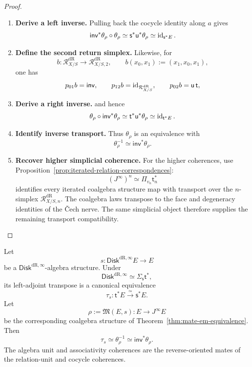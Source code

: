 \begin{proof}
\begin{enumerate}[label=\textup{(\arabic*)}]
    \item \textbf{Derive a left inverse.}
Pulling back the cocycle identity along \(a\) gives
\[
  \mathsf{inv}^*\theta_\rho\circ\theta_\rho
  \simeq
  \mathsf s^*\mathsf u^*\theta_\rho
  \simeq
  \operatorname{id}_{\mathsf s^*E}.
\]

    \item \textbf{Define the second return simplex.}
Likewise, for
\[
  b:\mathcal R^{\mathrm{dR}}_{X/S}\to \mathcal R^{\mathrm{dR}}_{X/S,2},
  \qquad
  b(x_0,x_1):=(x_1,x_0,x_1),
\]
one has
\[
  p_{01}b=\mathsf{inv},
  \qquad
  p_{12}b=\operatorname{id}_{\mathcal R^{\mathrm{dR}}_{X/S}},
  \qquad
  p_{02}b=\mathsf u\,\mathsf t,
\]

    \item \textbf{Derive a right inverse.}
and hence
\[
  \theta_\rho\circ\mathsf{inv}^*\theta_\rho
  \simeq
  \mathsf t^*\mathsf u^*\theta_\rho
  \simeq
  \operatorname{id}_{\mathsf t^*E}.
\]

    \item \textbf{Identify inverse transport.}
Thus \(\theta_\rho\) is an equivalence with
\[
  \theta_\rho^{-1}\simeq\mathsf{inv}^*\theta_\rho.
\]

    \item \textbf{Recover higher simplicial coherence.}
For the higher coherences, use
Proposition~\ref{prop:iterated-relation-correspondences}:
\[
  (J^\infty)^n
  \simeq
  \Pi_{v_n}\mathsf t_n^*
\]
identifies every iterated coalgebra structure map with transport over the
\(n\)-simplex \(\mathcal R^{\mathrm{dR}}_{X/S,n}\). The coalgebra laws transpose to the face and degeneracy identities of the
\v{C}ech nerve. The same simplicial object therefore supplies the remaining
transport compatibility.
\end{enumerate}
\end{proof}

\begin{proposition}
\label{prop:disk-algebra-relation-transport}
Let
\[
  s:\mathsf{Disk}^{\mathrm{dR},\infty} E\longrightarrow E
\]
be a \(\mathsf{Disk}^{\mathrm{dR},\infty}\)-algebra structure. Under
\[
  \mathsf{Disk}^{\mathrm{dR},\infty}\simeq\Sigma_{\mathsf s}\mathsf t^*,
\]
its left-adjoint transpose is a canonical equivalence
\[
  \tau_s:\mathsf t^*E\xrightarrow{\simeq}\mathsf s^*E.
\]
Let
\[
  \rho:=\mathfrak M(E,s):E\longrightarrow J^\infty E
\]
be the corresponding coalgebra structure of
Theorem~\ref{thm:mate-em-equivalence}. Then
\[
  \tau_s
  \simeq
  \theta_\rho^{-1}
  \simeq
  \mathsf{inv}^*\theta_\rho.
\]
The algebra unit and associativity coherences are the reverse-oriented mates of
the relation-unit and cocycle coherences.
\end{proposition}


